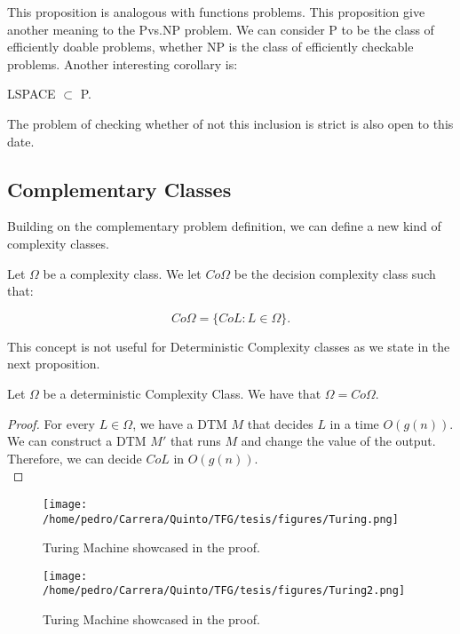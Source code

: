 This proposition is analogous with functions problems. This proposition give another meaning to the Pvs.NP problem. We can consider P to be the class of efficiently doable problems, whether NP is the class of efficiently checkable problems. Another interesting corollary is:\\

\begin{corollary}
  LSPACE $\subset$ P.
\end{corollary}

The problem of checking whether of not this inclusion is strict is also open to this date.


\subsection{Complementary Classes}

Building on the complementary problem definition, we can define a new kind of complexity classes.

\begin{definition}
  Let $\Omega$ be a complexity class. We let $Co\Omega$ be the decision complexity class such that:

  $$Co\Omega = \{CoL : L\in \Omega\}.$$
\end{definition}

This concept is not useful for Deterministic Complexity classes as we state in the next proposition.
\begin{proposition}
Let $\Omega$ be a deterministic Complexity Class. We have that $\Omega = Co\Omega$.
\end{proposition}
\begin{proof}
  For every $L\in \Omega$, we have a DTM $M$ that decides $L$ in a time $O(g(n))$. We can construct a DTM $M'$ that runs $M$ and change the value of the output. Therefore, we can decide $CoL$ in $O(g(n))$. \\
\end{proof}

\begin{figure}[h]
  \begin{center}
    \texttt{[image: /home/pedro/Carrera/Quinto/TFG/tesis/figures/Turing.png]}
  \end{center}
  \caption{Turing Machine showcased in the proof.}
\end{figure}
\begin{figure}[h]
  \begin{center}
    \texttt{[image: /home/pedro/Carrera/Quinto/TFG/tesis/figures/Turing2.png]}
  \end{center}
  \caption{Turing Machine showcased in the proof.}
\end{figure}


